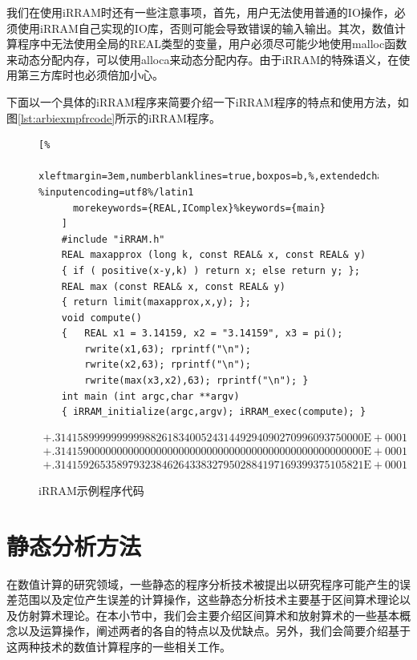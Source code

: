 我们在使用iRRAM时还有一些注意事项，首先，用户无法使用普通的IO操作，必须使用iRRAM自己实现的IO库，否则可能会导致错误的输入输出。其次，数值计算程序中无法使用全局的REAL类型的变量，用户必须尽可能少地使用malloc函数来动态分配内存，可以使用alloca来动态分配内存。由于iRRAM的特殊语义，在使用第三方库时也必须倍加小心。

下面以一个具体的iRRAM程序来简要介绍一下iRRAM程序的特点和使用方法，如图\ref{lst:arbiexmpfrcode}所示的iRRAM程序。

\begin{figure}[thbp]
    \begin{lstlisting}[%
      xleftmargin=3em,numberblanklines=true,boxpos=b,%,extendedchars=\true, %inputencoding=utf8%/latin1
      morekeywords={REAL,IComplex}%keywords={main}
    ]
    #include "iRRAM.h"
    REAL maxapprox (long k, const REAL& x, const REAL& y)
    { if ( positive(x-y,k) ) return x; else return y; };
    REAL max (const REAL& x, const REAL& y)
    { return limit(maxapprox,x,y); };
    void compute()
    {   REAL x1 = 3.14159, x2 = "3.14159", x3 = pi();
        rwrite(x1,63); rprintf("\n"); 
        rwrite(x2,63); rprintf("\n"); 
        rwrite(max(x3,x2),63); rprintf("\n"); }
    int main (int argc,char **argv)
    { iRRAM_initialize(argc,argv); iRRAM_exec(compute); }
    \end{lstlisting}
    \begin{align*}
        +.3141589999999999882618340052431449294090270996093750000\text{E}+0001 \\
        +.3141590000000000000000000000000000000000000000000000000\text{E}+0001 \\
        +.3141592653589793238462643383279502884197169399375105821\text{E}+0001
    \end{align*}

    \caption{iRRAM示例程序代码}
    \label{lst:irramexcode}
\end{figure}



\section{静态分析方法}
在数值计算的研究领域，一些静态的程序分析技术被提出以研究程序可能产生的误差范围以及定位产生误差的计算操作，这些静态分析技术主要基于区间算术理论以及仿射算术理论。在本小节中，我们会主要介绍区间算术和放射算术的一些基本概念以及运算操作，阐述两者的各自的特点以及优缺点。另外，我们会简要介绍基于这两种技术的数值计算程序的一些相关工作。

